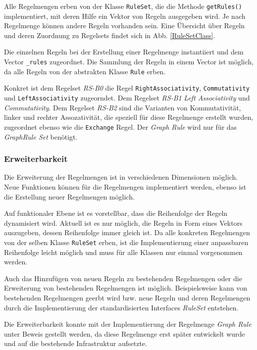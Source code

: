 Alle Regelmengen erben von der Klasse \texttt{RuleSet}, die die Methode \texttt{getRules()} implementiert, mit deren Hilfe ein Vektor von Regeln ausgegeben wird. Je nach Regelmenge können andere Regeln vorhanden sein. Eine Übersicht über Regeln und deren Zuordnung zu Regelsets findet sich in Abb. \ref{RuleSetClass}.

Die einzelnen Regeln bei der Erstellung einer Regelmenge instantiiert und dem Vector \texttt{\_rules} zugeordnet. Die Sammlung der Regeln in einem Vector ist möglich, da alle Regeln von der abstrakten Klasse \texttt{Rule} erben. 

Konkret ist dem Regelset \textit{RS-B0} die Regel \texttt{RightAssociativity}, \texttt{Commutativity} und \texttt{LeftAssociativity} zugeorndet. Dem Regelset \textit{RS-B1} \textit{Left Associativity} und \textit{Commutativity}. Dem Regelset \textit{RS-B2} sind die Varianten von Kommutativität, linker und rechter Assozativität, die speziell für diese Regelmenge erstellt wurden, zugeordnet ebenso wie die \texttt{Exchange} Regel. Der \textit{Graph Rule} wird nur für das \textit{GraphRule Set} benötigt.

\subsubsection{Erweiterbarkeit}
Die Erweiterung der Regelmengen ist in verschiedenen Dimensionen möglich. Neue Funktionen können für die Regelmengen implementiert werden, ebenso ist die Erstellung neuer Regelmengen möglich.

Auf funktionaler Ebene ist es vorstellbar, dass die Reihenfolge der Regeln dynamisiert wird. Aktuell ist es nur möglich, die Regeln in Form eines Vektors auszugeben, dessen Reihenfolge immer gleich ist. Da alle konkreten Regelmengen von der selben Klasse \texttt{RuleSet} erben, ist die Implementierung einer anpassbaren Reihenfolge leicht möglich und muss für alle Klassen nur einmal vorgenommen werden.


Auch das Hinzufügen von neuen Regeln zu bestehenden Regelmengen oder die Erweiterung von bestehenden Regelmengen ist möglich. Beispielsweise kann von bestehenden Regelmengen geerbt wird bzw. neue Regeln und deren Regelmengen durch die Implementierung der standardisierten Interfaces \textit{RuleSet} entstehen.

Die Erweiterbarkeit konnte mit der Implementierung der Regelmenge  \textit{Graph Rule} unter Beweis gestellt werden, da diese Regelmenge erst später entwickelt wurde und auf die bestehende Infrastruktur aufsetzte.




